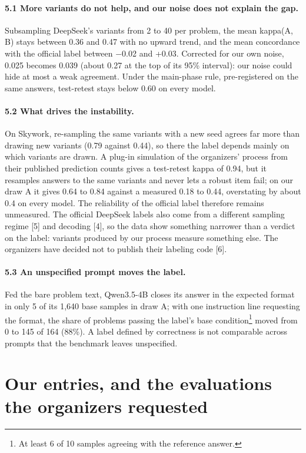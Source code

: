 \documentclass{article}
\begin{document}
\paragraph{5.1 More variants do not help, and our noise does not explain the gap.}
Subsampling DeepSeek's variants from 2 to 40 per problem, the mean kappa(A, B) stays between 0.36 and 0.47 with no upward trend, and the mean concordance with the official label between $-$0.02 and +0.03. Corrected for our own noise, 0.025 becomes 0.039 (about 0.27 at the top of its 95\% interval): our noise could hide at most a weak agreement. Under the main-phase rule, pre-registered on the same answers, test-retest stays below 0.60 on every model.

\paragraph{5.2 What drives the instability.}
On Skywork, re-sampling the same variants with a new seed agrees far more than drawing new variants (0.79 against 0.44), so there the label depends mainly on which variants are drawn. A plug-in simulation of the organizers' process from their published prediction counts gives a test-retest kappa of 0.94, but it resamples answers to the same variants and never lets a robust item fail; on our draw A it gives 0.64 to 0.84 against a measured 0.18 to 0.44, overstating by about 0.4 on every model. The reliability of the official label therefore remains unmeasured. The official DeepSeek labels also come from a different sampling regime [5] and decoding [4], so the data show something narrower than a verdict on the label: variants produced by our process measure something else. The organizers have decided not to publish their labeling code [6].

\paragraph{5.3 An unspecified prompt moves the label.}
Fed the bare problem text, Qwen3.5-4B closes its answer in the expected format in only 5 of its 1,640 base samples in draw A; with one instruction line requesting the format, the share of problems passing the label's base condition\footnote{At least 6 of 10 samples agreeing with the reference answer.} moved from 0 to 145 of 164 (88\%). A label defined by correctness is not comparable across prompts that the benchmark leaves unspecified.

\section{Our entries, and the evaluations the organizers requested}\label{sec:6}
\end{document}
